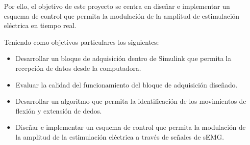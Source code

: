 Por ello, el objetivo de este proyecto se centra en diseñar e implementar un esquema de control que permita la modulación de la amplitud de estimulación eléctrica en tiempo real.

Teniendo como objetivos particulares los siguientes:

\begin{itemize}
	\item Desarrollar un bloque de adquisición dentro de Simulink que permita la recepción de datos desde la computadora.
	\item Evaluar la calidad del funcionamiento del bloque de adquisición diseñado.
	\item Desarrollar un algoritmo que permita la identificación de los movimientos de flexión y extensión de dedos.
	\item Diseñar e implementar un esquema de control que permita la modulación de la amplitud de la estimulación eléctrica a través de señales de sEMG.
\end{itemize}
